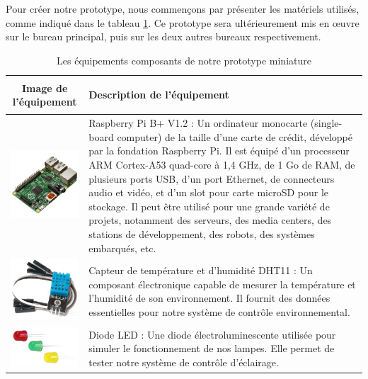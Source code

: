 Pour créer notre prototype, nous commençons par présenter les matériels utilisés, comme indiqué dans le tableau \ref{table:matériel-prototype}. Ce prototype sera ultérieurement mis en œuvre sur le bureau principal, puis sur les deux autres bureaux respectivement.


\begin{table}[H]
\begin{center}
\begin{tabular}{|c{3cm}|l{10cm}|}
\hline
\textbf{Image de l'équipement} & \begin{center} \textbf{Description de l'équipement} \end{center} \\
\hline
\includegraphics[width=3cm]{Images/RaspberryPi3.png} & Raspberry Pi B+ V1.2 : Un ordinateur monocarte (single-board computer) de la taille d'une carte de crédit, développé par la fondation Raspberry Pi. Il est équipé d'un processeur ARM Cortex-A53 quad-core à 1,4 GHz, de 1 Go de RAM, de plusieurs ports USB, d'un port Ethernet, de connecteurs audio et vidéo, et d'un slot pour carte microSD pour le stockage. Il peut être utilisé pour une grande variété de projets, notamment des serveurs, des media centers, des stations de développement, des robots, des systèmes embarqués, etc. \\
\hline
\includegraphics[width=3cm]{Images/DHT11.png} & Capteur de température et d'humidité DHT11 : Un composant électronique capable de mesurer la température et l'humidité de son environnement. Il fournit des données essentielles pour notre système de contrôle environnemental. \\
\hline
\includegraphics[width=3cm]{Images/DiodeLED.png} & Diode LED : Une diode électroluminescente utilisée pour simuler le fonctionnement de nos lampes. Elle permet de tester notre système de contrôle d'éclairage. \\
\hline
\end{tabular}
\caption{Les équipements composants de notre prototype miniature}
\label{table:matériel-prototype}
\end{center}
\end{table}




